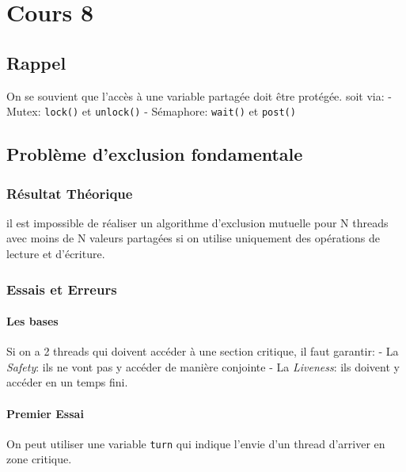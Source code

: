\section{Cours 8}\label{cours-8}

\subsection{Rappel}\label{rappel}

On se souvient que l'accès à une variable partagée doit être protégée.
soit via: - Mutex: \texttt{lock()} et \texttt{unlock()} - Sémaphore:
\texttt{wait()} et \texttt{post()}

\subsection{Problème d'exclusion
fondamentale}\label{probluxe8me-dexclusion-fondamentale}

\subsubsection{Résultat Théorique}\label{ruxe9sultat-thuxe9orique}

il est impossible de réaliser un algorithme d'exclusion mutuelle pour N
threads avec moins de N valeurs partagées si on utilise uniquement des
opérations de lecture et d'écriture.

\subsubsection{Essais et Erreurs}\label{essais-et-erreurs}

\paragraph{Les bases}\label{les-bases}

Si on a 2 threads qui doivent accéder à une section critique, il faut
garantir: - La \emph{Safety}: ils ne vont pas y accéder de manière
conjointe - La \emph{Liveness}: ils doivent y accéder en un temps fini.

\paragraph{Premier Essai}\label{premier-essai}

On peut utiliser une variable \texttt{turn} qui indique l'envie d'un
thread d'arriver en zone critique.

